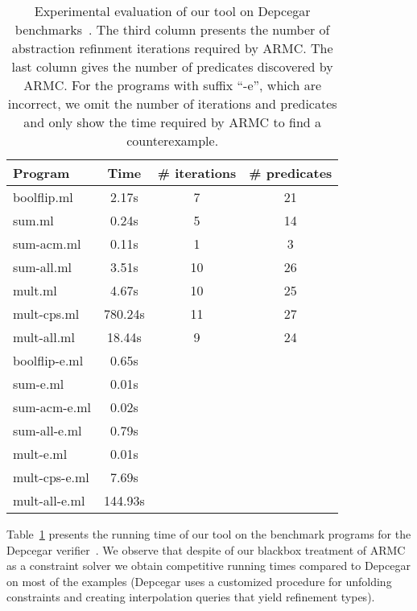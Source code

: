 \documentclass[nocopyrightspace]{sigplanconf}
\newcommand\ARMC{\textsc{ARMC}\xspace}
\begin{document}
\begin{table}[t]
\begin{small}
  \centering
  \begin{tabular}{|l||c|c|c|}
   \hline
    \textbf{Program} & \textbf{Time} & \textbf{\# iterations}
    & \textbf{\# predicates}\\ \hline\hline
boolflip.ml & 2.17s & 7 & 21 \\ \hline
sum.ml & 0.24s & 5 & 14 \\ \hline
sum-acm.ml & 0.11s & 1 & 3 \\ \hline
sum-all.ml & 3.51s & 10 & 26 \\ \hline
mult.ml & 4.67s & 10 & 25 \\ \hline
mult-cps.ml & 780.24s & 11 & 27 \\ \hline
mult-all.ml & 18.44s & 9 & 24 \\ \hline\hline
boolflip-e.ml & 0.65s & \multicolumn{2}{c|}{} \\ \cline{1-2}
 sum-e.ml & 0.01s & \multicolumn{2}{c|}{} \\ \cline{1-2}
sum-acm-e.ml & 0.02s & \multicolumn{2}{c|}{} \\ \cline{1-2}
sum-all-e.ml & 0.79s & \multicolumn{2}{c|}{} \\ \cline{1-2}
mult-e.ml & 0.01s & \multicolumn{2}{c|}{} \\ \cline{1-2}
mult-cps-e.ml & 7.69s & \multicolumn{2}{c|}{} \\ \cline{1-2}
mult-all-e.ml & 144.93s & \multicolumn{2}{c|}{} \\ \hline
\end{tabular}
  \caption{Experimental evaluation of our tool on Depcegar
    benchmarks~\cite{TerauchiPOPL2010}.
    The third column presents the number of abstraction refinment
    iterations required by \ARMC. 
    The last column gives the number of predicates discovered by
    \ARMC.
    For the programs with suffix ``-e'', which are incorrect, we omit
    the number of iterations and predicates and only show the time
    required by \ARMC to find a counterexample. }
  \label{tab-terauchi-popl2010}
\end{small}
\end{table}



Table~\ref{tab-terauchi-popl2010} presents the running time of our
tool on the benchmark programs for the Depcegar
verifier~\cite{TerauchiPOPL2010}.
We observe that despite of our blackbox treatment of \ARMC as a
constraint solver we obtain competitive running times compared to
Depcegar on most of the examples (Depcegar uses a customized procedure
for unfolding constraints and creating interpolation queries that
yield refinement types).
\end{document}
